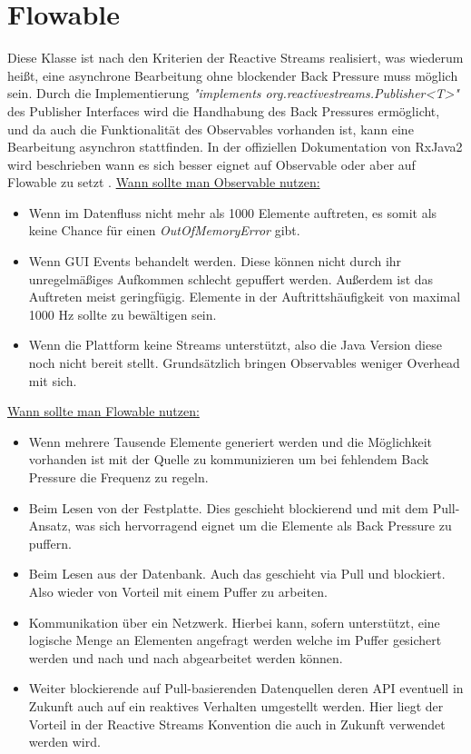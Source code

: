 \section{Flowable}
Diese Klasse ist nach den Kriterien der Reactive Streams realisiert, was wiederum heißt, eine asynchrone Bearbeitung ohne blockender Back Pressure muss möglich sein. Durch die Implementierung \textit{"implements org.reactivestreams.Publisher<T>"} des Publisher Interfaces wird die Handhabung des Back Pressures ermöglicht, und da auch die Funktionalität des Observables vorhanden ist, kann eine Bearbeitung asynchron stattfinden. In der offiziellen Dokumentation von RxJava2 wird beschrieben wann es sich besser eignet auf Observable oder aber auf Flowable zu setzt \cite{rxdifference}. \underline{Wann sollte man Observable nutzen:}
\begin{itemize}
	\item Wenn im Datenfluss nicht mehr als 1000 Elemente auftreten, es somit als keine Chance für einen \textit{OutOfMemoryError} gibt.
	\item Wenn GUI Events behandelt werden. Diese können nicht durch ihr unregelmäßiges Aufkommen schlecht gepuffert werden. Außerdem ist das Auftreten meist geringfügig. Elemente in der Auftrittshäufigkeit von maximal 1000 Hz sollte zu bewältigen sein.
	\item Wenn die Plattform keine Streams unterstützt, also die Java Version diese noch nicht bereit stellt. Grundsätzlich bringen Observables weniger Overhead mit sich.
\end{itemize}
\underline{Wann sollte man Flowable nutzen:}
\begin{itemize}
	\item Wenn mehrere Tausende Elemente generiert werden und die Möglichkeit vorhanden ist mit der Quelle zu kommunizieren um bei fehlendem Back Pressure die Frequenz zu regeln.
	\item Beim Lesen von der Festplatte. Dies geschieht blockierend und mit dem Pull-Ansatz, was sich hervorragend eignet um die Elemente als Back Pressure zu puffern.
	\item Beim Lesen aus der Datenbank. Auch das geschieht via Pull und blockiert. Also wieder von Vorteil mit einem Puffer zu arbeiten.
	\item Kommunikation über ein Netzwerk. Hierbei kann, sofern unterstützt, eine logische Menge an Elementen angefragt werden welche im Puffer gesichert werden und nach und nach abgearbeitet werden können.
	\item Weiter blockierende auf Pull-basierenden Datenquellen deren API eventuell in Zukunft auch auf ein reaktives Verhalten umgestellt werden. Hier liegt der Vorteil in der Reactive Streams Konvention die auch in Zukunft verwendet werden wird.
\end{itemize}
